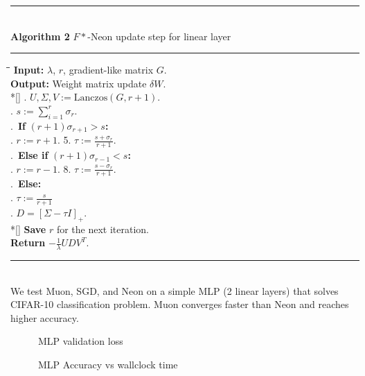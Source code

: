 \documentclass[a1]{a1poster}
\def\Head#1{\noindent{\LARGE\color{bluegray} #1}\bigskip}
\begin{document}
\begin{textblock}{7.0}
{\footnotesize{}
\noindent\rule[-5pt]{.8\textwidth}{0.4pt}\\
{\bf Algorithm 2} $F*$-Neon update step for linear layer\\
\noindent\rule[5pt]{.8\textwidth}{0.4pt}
\vspace{-15pt}
\noindent\begin{tabbing}
    \qquad\=\qquad\=\qquad\=\kill %
    {\bf Input:} $\lambda$, $r$, gradient-like matrix $G$. \\
    {\bf Output:} Weight matrix update $\delta W$.\\*[\smallskipamount]
    . $U, \Sigma, V := \textrm{Lanczos}(G, r + 1)$. \\
    . $s := \sum_{i=1}^{r}\sigma_r$. \\
    .\ {\bf If} $(r + 1)\sigma_{r + 1} > s${\bf:}\\
    \>. $r := r + 1$. 5. $\tau := \frac{s + \sigma_{r}}{r + 1}$.\\
    .\ {\bf Else if} $(r + 1)\sigma_{r - 1} < s${\bf:}\\
    \>. $r := r - 1$. 8. $\tau := \frac{s - \sigma_{r}}{r + 1}$.\\
    .\ {\bf Else:}\\
    \>. $\tau := \frac{s}{r + 1}$\\
    . $D = [\Sigma - \tau I]_+$. \\*[\smallskipamount]
    {\bf Save} $r$ for the next iteration.\\
    {\bf Return} $-\frac{1}{\lambda}U D V^T$.
\end{tabbing}
\vspace{10pt}
}

\hrule\medskip
\Head{MLP tests}\\
We test Muon, SGD, and Neon on a simple MLP (2 linear layers) that solves CIFAR-10 classification problem. Muon converges faster than Neon and reaches higher accuracy.
\begin{figure}[h]
    \caption{MLP validation loss}
    \label{fig:mlp_loss}
\end{figure} 

\begin{figure}[h]
    \caption{MLP Accuracy vs wallclock time}
    \label{fig:mlp_loss}
\end{figure} 

\end{textblock}
\end{document}
